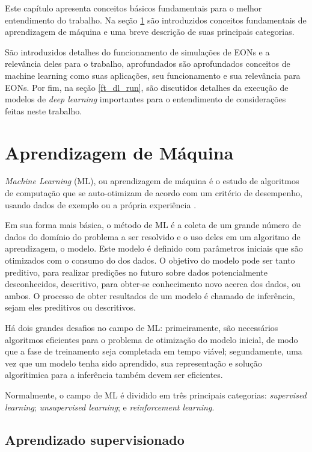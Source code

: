 Este capítulo apresenta conceitos básicos fundamentais para o melhor entendimento do trabalho. Na seção \ref{ml} são introduzidos conceitos fundamentais de aprendizagem de máquina e uma breve descrição de suas principais categorias.

São introduzidos detalhes do funcionamento de simulações de EONs e a relevância deles para o trabalho, aprofundados são aprofundados conceitos de machine learning como suas aplicações, seu funcionamento e sua relevância para EONs. Por fim, na seção \ref{ft_dl_run}, são discutidos detalhes da execução de modelos de \textit{deep learning} importantes para o entendimento de considerações feitas neste trabalho.

\section{Aprendizagem de Máquina}
\label{ml}

\textit{Machine Learning} (ML), ou aprendizagem de máquina é o estudo de algoritmos de computação que se auto-otimizam de acordo com um critério de desempenho, usando dados de exemplo ou a própria experiência \cite{mitchell1997ml, alpaydin2020introduction}.

Em sua forma mais básica, o método de ML é a coleta de um grande número de dados do domínio do problema a ser resolvido e o uso deles em um algoritmo de aprendizagem, o modelo. Este modelo é definido com parâmetros iniciais que são otimizados com o consumo do dos dados. O objetivo do modelo pode ser tanto preditivo, para realizar predições no futuro sobre dados potencialmente desconhecidos, descritivo, para obter-se conhecimento novo acerca dos dados, ou ambos. O processo de obter resultados de um modelo é chamado de inferência, sejam eles preditivos ou descritivos.

Há dois grandes desafios no campo de ML: primeiramente, são necessários algoritmos eficientes para o problema de otimização do modelo inicial, de modo que a fase de treinamento seja completada em tempo viável; segundamente, uma vez que um modelo tenha sido aprendido, sua representação e solução algorítimica para a inferência também devem ser eficientes. \cite{alpaydin2020introduction} \cite{brief_introduction_to_ml}

Normalmente, o campo de ML é dividido em três principais categorias: \textit{supervised learning}; \textit{unsupervised learning}; e \textit{reinforcement learning}.

\subsection{Aprendizado supervisionado}

